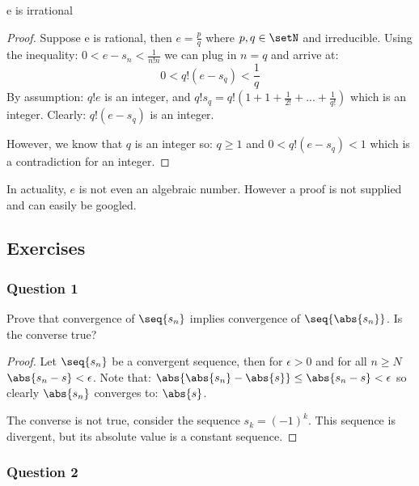 \documentclass[12pt, letterpaper]{paper}
\begin{document}
\begin{theorem}
  \label{thr:3.32}
  e is irrational
\end{theorem}
\begin{proof}
  Suppose e is rational, then $e = \frac{p}{q}$ where $p,q \in \setN$
  and irreducible. Using the inequality:
  $0 < e - s_n < \frac{1}{n!  n}$ we can plug in $n = q$ and arrive
  at:
  \begin{equation*}
    0 < q! ( e - s_q ) < \frac{1}{q}
  \end{equation*}
  By assumption: $q!e$ is an integer, and
  $q! s_q = q!( 1 + 1 + \frac{1}{2!} + ... + \frac{1}{q!} )$ which is
  an integer. Clearly: $q!  ( e - s_q)$ is an integer. \par
  However, we know that $q$ is an integer so: $q \geq 1$ and
  $ 0 < q!( e - s_q ) < 1$ which is a contradiction for an integer.
\end{proof}

In actuality, $e$ is not even an algebraic number. However a proof is
not supplied and can easily be googled.

\subsection*{Exercises}

\subsubsection*{Question 1}

\begin{question}
  Prove that convergence of $\seq{s_n}$ implies convergence of
  $\seq{\abs{s_n}}$. Is the converse true?
\end{question}
\begin{proof}
  Let $\seq{s_n}$ be a convergent sequence, then for $\epsilon > 0$
  and for all $n \geq N$ $\abs{ s_n - s} < \epsilon$. Note that:
  $\abs{ \abs{s_n} - \abs{s}} \leq \abs{s_n -s } < \epsilon$ so
  clearly $\abs{s_n}$ converges to: $\abs{s}$.

  The converse is not true, consider the sequence $s_k = (-1)^k$. This
  sequence is divergent, but its absolute value is a constant
  sequence.
\end{proof}

\subsubsection*{Question 2}
\end{document}
